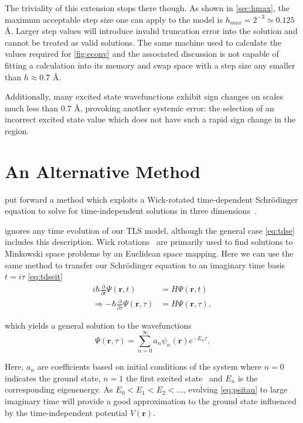The triviality of this extension stops there though.
As shown in \cref{sec:hmax}, the maximum acceptable step size one can apply to the model is $h_{max} = 2^{-3} \simeq 0.125$ Å.
Larger step values will introduce invalid truncation error into the solution and cannot be treated as valid solutions.
The same machine used to calculate the values required for \cref{fig:econv} and the associated discussion is not capable of fitting a  calculation into its memory and swap space with a step size any smaller than $h \approx 0.7$ Å.

Additionally, many excited state wavefunctions exhibit sign changes on scales much less than $0.7$ Å, provoking another systemic error: the selection of an incorrect excited state value which does not have such a rapid sign change in the region.

\section{An Alternative Method}\label{sec:meth3d}

\citeauthor{Strickland2010} put forward a method which exploits a Wick-rotated time-dependent Schr\"{o}dinger equation to solve for time-independent solutions in three dimensions~\cite{Strickland2010}.

 ignores any time evolution of our TLS model, although the general case \cref{eq:tdse} includes this description.
Wick rotations~\cite{Wick1954} are primarily used to find solutions to Minkowski space problems by an Euclidean space mapping.
Here we can use the same method to transfer our Schr\"{o}dinger equation to an imaginary time basis $t=i\tau$ \cref{eq:tdseit}
\begin{align}
i \hbar \frac{\partial}{\partial t}\Psi(\mathbf{r},t) &= H\Psi(\mathbf{r},t)\label{eq:tdse}\\
\Rightarrow - \hbar \frac{\partial}{\partial \tau}\Psi(\mathbf{r},\tau) &= H\Psi(\mathbf{r},\tau),\label{eq:tdseit}
\end{align}

which yields a general solution to the wavefunctions
\begin{equation}
\Psi(\mathbf{r},\tau) = \sum_{n=0}^\infty a_n\psi_n(\mathbf{r})e^{-E_n \tau}.\label{eq:psitau}
\end{equation}

Here, ${a_n}$ are coefficients based on initial conditions of the system where $n=0$ indicates the ground state, $n=1$ the first excited state \etc\ and $E_n$ is the corresponding eigenenergy.
As $E_0 < E_1 < E_2 < \ldots$, evolving \cref{eq:psitau} to large imaginary time will provide a good approximation to the ground state influenced by the time-independent potential $V(\mathbf{r})$.

